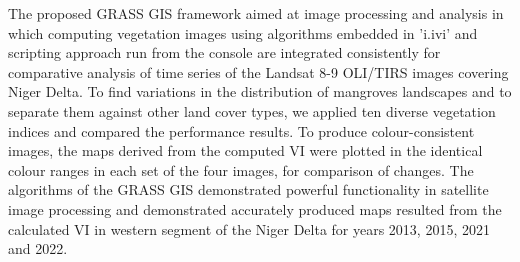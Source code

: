 \documentclass[jmse,article,submit,pdftex,moreauthors]{Definitions/mdpi}
\begin{document}
The proposed GRASS GIS framework aimed at image processing and analysis in which computing vegetation images using algorithms embedded in 'i.ivi' and scripting approach run from the console are integrated consistently for comparative analysis of time series of the Landsat 8-9 OLI/TIRS images covering Niger Delta. To find variations in the distribution of mangroves landscapes and to separate them against other land cover types, we applied ten diverse vegetation indices and compared the performance results. To produce colour-consistent images, the maps derived from the computed VI were plotted in the identical colour ranges in each set of the four images, for comparison of changes. The algorithms of the GRASS GIS demonstrated powerful functionality in satellite image processing and demonstrated accurately produced maps resulted from the calculated VI in western segment of the Niger Delta for years 2013, 2015, 2021 and 2022. 







\end{document}
